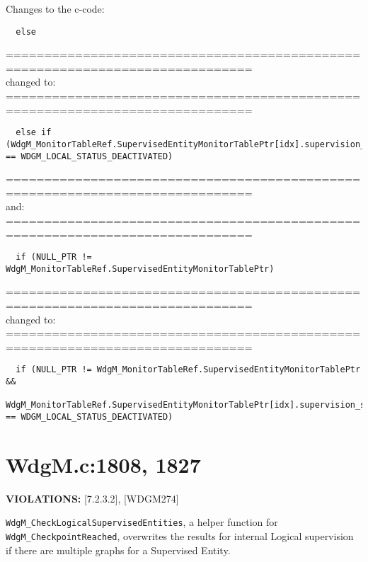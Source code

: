 \documentclass[11pt,a4paper]{article}
\begin{document}
\lstset{language=c}

Changes to the c-code:
\begin{lstlisting}
  else
\end{lstlisting}
==============================================================================\\
changed to:\\
==============================================================================
\begin{lstlisting}
  else if (WdgM_MonitorTableRef.SupervisedEntityMonitorTablePtr[idx].supervision_status == WDGM_LOCAL_STATUS_DEACTIVATED)
\end{lstlisting}
==============================================================================\\
and:\\
==============================================================================
\begin{lstlisting}
  if (NULL_PTR != WdgM_MonitorTableRef.SupervisedEntityMonitorTablePtr)
\end{lstlisting}
==============================================================================\\
changed to:\\
==============================================================================
\begin{lstlisting}
  if (NULL_PTR != WdgM_MonitorTableRef.SupervisedEntityMonitorTablePtr &&
  WdgM_MonitorTableRef.SupervisedEntityMonitorTablePtr[idx].supervision_status == WDGM_LOCAL_STATUS_DEACTIVATED)
\end{lstlisting}
\newpage

\section{WdgM.c:1808, 1827}
\textbf{VIOLATIONS:} [7.2.3.2], [WDGM274]\\[0.5cm]

\lstset{language=autosar}

\lstinline!WdgM_CheckLogicalSupervisedEntities!, a helper function for
\lstinline!WdgM_CheckpointReached!, overwrites the results for internal Logical
supervision if there are multiple graphs for a Supervised Entity.\\
\end{document}
